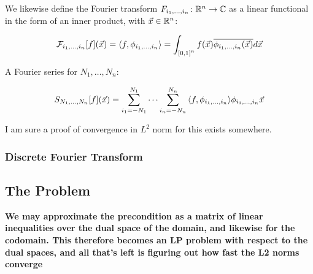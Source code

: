 \documentclass[12pt]{article}
\begin{document}
We likewise define the
Fourier transform ${F_{i_1, \ldots, i_n} \colon {\mathbb{R}}^n \to {\mathbb{C}}}$ as a
linear functional in the form of an inner product,
with $\vec{x} \in {\mathbb{R}}^n$:

\begin{align*}
  \mathcal{F}_{i_1, \ldots, i_n} {\left[f\right]} {\left(\vec{x}\right)}
    = {\left\langle f, \phi_{i_1, \ldots, i_n}\right\rangle}
    = \int_{{\left[0, 1\right]}^n}
      f{\left(\vec{x}\right)} \overline{\phi_{i_1, \ldots, i_n} {\left(\vec{x}\right)}} d \vec{x}
\end{align*}

A Fourier series for $N_1, \ldots, N_n$:

\begin{align*}
  S_{N_1, \ldots, N_n} {\left[f\right]} {\left(\vec{x}\right)}
    = \sum_{i_1 = -N_1}^{N_1} \cdots \sum_{i_n = -N_n}^{N_n}
        {\left\langle f, \phi_{i_1, \ldots, i_n}\right\rangle} \phi_{i_1, \ldots, i_n} \vec{x}
\end{align*}

I am sure a proof of convergence in $L^2$ norm for this exists somewhere.

\subsubsection{Discrete Fourier Transform}



\subsection{The Problem}


\textbf{We may approximate the precondition as a matrix of linear inequalities
over the dual space of the domain, and likewise for the codomain.
This therefore becomes an LP problem with respect to the dual spaces, and
all that's left is figuring out how fast the L2 norms converge}
\end{document}
